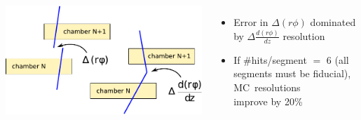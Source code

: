 \documentclass[compress]{beamer}
\begin{document}
\begin{frame}
\begin{columns}
\includegraphics[width=\linewidth]{residuals_diagrams.pdf}

\begin{itemize}
\item Error in $\Delta (r\phi)$ dominated by $\Delta \frac{d(r\phi)}{dz}$ resolution

\item If \#hits/segment $=$ 6 (all segments must be fiducial), \mbox{MC resolutions\hspace{-1 cm}} \\ improve by 20\%
\end{itemize}
\end{columns}
\end{frame}

\end{document}
